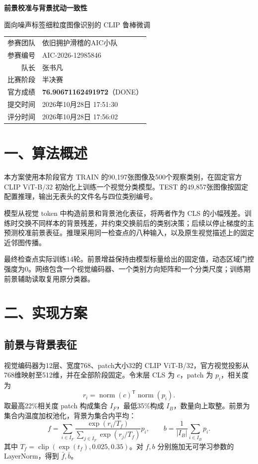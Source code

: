 \documentclass[UTF8,fontset=none,zihao=-4]{ctexart}
\newcommand{\norm}[1]{\operatorname{norm}\!\left(#1\right)}
\begin{document}
\begin{center}
{\LARGE\bfseries\sffamily 前景校准与背景扰动一致性}\par\medskip
{\large 面向噪声标签细粒度图像识别的 CLIP 鲁棒微调}\par\bigskip
\begin{tabular}{rl}
参赛团队 & 依旧拥护滑稽的AIC小队\\
参赛编号 & AIC-2026-12985846\\
队长 & 张书凡\\
比赛阶段 & 半决赛\\
官方成绩 & \textbf{76.90671162491972}（DONE）\\
提交时间 & 2026年10月28日 17:51:30\\
评分时间 & 2026年10月28日 17:56:02
\end{tabular}
\end{center}
\section*{一、算法概述}
本方案使用本阶段官方 TRAIN 的90,197张图像及500个观察类别，在固定官方 CLIP ViT-B/32 初始化上训练一个视觉分类模型。TEST 的49,857张图像按固定配置推理，输出无表头的文件名与四位类别编号。

模型从视觉 token 中构造前景和背景池化表征，将两者作为 CLS 的小幅残差。训练时交换不同样本的背景残差，并约束交换前后的类别决策；后续以停止梯度的主预测校准前景表征。推理采用同一检查点的八种输入，以及原生视觉描述上的固定近邻图传播。

最终检查点实际训练14轮。前景增益保持由模型标量给出的固定值，动态区域门控强度为0。网络包含一个视觉编码器、一个类别方向矩阵和一个分类尺度；训练期前景辅助读取复用原分类器。

\section*{二、实现方案}
\subsection*{前景与背景表征}
视觉编码器为12层、宽度768、patch大小32的 CLIP ViT-B/32，官方视觉投影从768维映射至512维，并在全部阶段固定。令末层 CLS 为 $c$，patch 为 $p_i$，相关度为
\[
r_i=\norm{c}^{\mathsf T}\norm{p_i}.
\]
取最高22\%相关度 patch 构成集合 $I_F$，最低35\%构成 $I_B$，数量向上取整。前景为集合内温度加权池化，背景为集合内平均：
\[
f=\sum_{i\in I_F}\frac{\exp(r_i/T_f)}{\sum_{j\in I_F}\exp(r_j/T_f)}p_i,
\qquad b=\frac1{|I_B|}\sum_{i\in I_B}p_i.
\]
其中 $T_f=\operatorname{clip}(\exp(t_f),0.025,0.35)$。对 $f,b$ 分别施加无可学习参数的 LayerNorm，得到 $\bar f,\bar b$。
\end{document}
